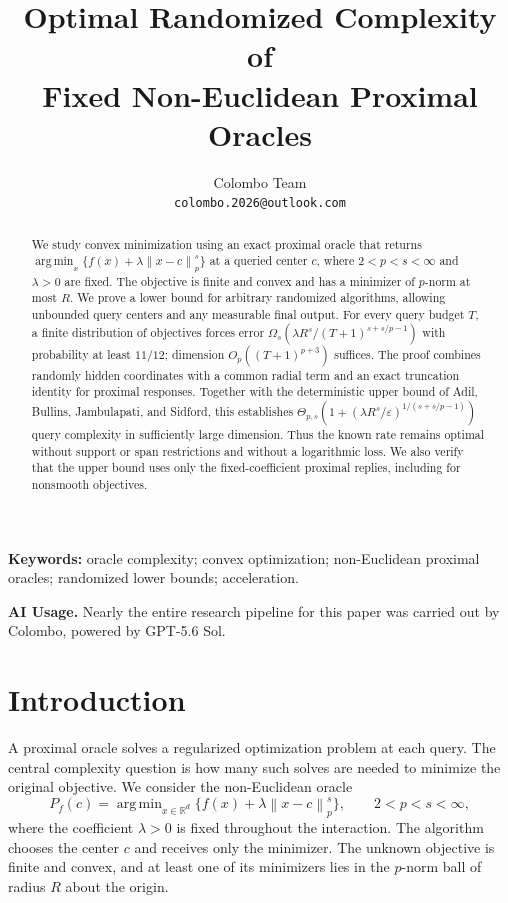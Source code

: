 \documentclass[11pt]{article}
\title{Optimal Randomized Complexity of\\
Fixed Non-Euclidean Proximal Oracles}
\author{Colombo Team\\[3pt]
  \texttt{colombo.2026@outlook.com}}
\date{}
\theoremstyle{definition}
\theoremstyle{remark}
\newcommand{\R}{\mathbb R}
\newcommand{\eps}{\varepsilon}
\newcommand{\norm}[1]{\left\lVert#1\right\rVert}
\DeclareMathOperator*{\argmin}{arg\,min}
\begin{document}
\maketitle

\begin{abstract}
We study convex minimization using an exact proximal oracle that returns
$\argmin_x\{f(x)+\lambda\norm{x-c}_p^s\}$ at a queried center $c$, where
$2<p<s<\infty$ and $\lambda>0$ are fixed. The objective is finite and convex
and has a minimizer of $p$-norm at most $R$. We prove a lower bound for
arbitrary randomized algorithms, allowing unbounded query centers and any
measurable final output. For every query budget $T$, a finite distribution
of objectives forces error
$\Omega_s(\lambda R^s/(T+1)^{s+s/p-1})$ with probability at least $11/12$;
dimension $O_p((T+1)^{p+3})$ suffices. The proof combines randomly hidden
coordinates with a common radial term and an exact truncation identity for
proximal responses. Together with the deterministic upper bound of Adil,
Bullins, Jambulapati, and Sidford, this establishes
$\Theta_{p,s}(1+(\lambda R^s/\eps)^{1/(s+s/p-1)})$ query complexity in
sufficiently large dimension. Thus the known rate remains optimal without
support or span restrictions and without a logarithmic loss. We also verify
that the upper bound uses only the fixed-coefficient proximal replies,
including for nonsmooth objectives.
\end{abstract}

\noindent\textbf{Keywords:} oracle complexity; convex optimization;
non-Euclidean proximal oracles; randomized lower bounds; acceleration.
\par\medskip

\begin{samepage}
\noindent\textbf{AI Usage.}
Nearly the entire research pipeline for this paper was carried out by
Colombo, powered by GPT-5.6 Sol.
\par
\end{samepage}

\section{Introduction}\label{sec:introduction}

A proximal oracle solves a regularized optimization problem at each query.
The central complexity question is how many such solves are needed to
minimize the original objective. We consider the non-Euclidean oracle
\begin{equation}\label{eq:intro-oracle}
P_f(c)=\argmin_{x\in\R^d}
\bigl\{f(x)+\lambda\norm{x-c}_p^s\bigr\},
\qquad 2<p<s<\infty,
\end{equation}
where the coefficient $\lambda>0$ is fixed throughout the interaction.
The algorithm chooses the center $c$ and receives only the minimizer.
The unknown objective is finite and convex, and at least one of its
minimizers lies in the $p$-norm ball of radius $R$ about the origin.
\end{document}
